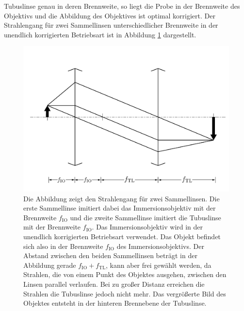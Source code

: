 \documentclass[a4paper, titlepage,  ngerman, fullpage]{book}
\begin{document}
Tubuslinse genau in deren Brennweite, so liegt die Probe in der Brennweite des Objektivs und die Abbildung des Objektives ist optimal korrigiert.\cite{Kuhl.2018} Der Strahlengang für zwei Sammellinsen unterschiedlicher Brennweite in der unendlich korrigierten Betriebsart ist in Abbildung \ref{fig:bildentstehungobjektiv} dargestellt.
	\begin{figure}
		\centering
		\includegraphics[width=0.7\linewidth]{figures/BildentstehungObjektiv.pdf}
		\caption[Strahlengang eines unendlich korrigierten Objektivs]{Die Abbildung zeigt den Strahlengang für zwei Sammellinsen. Die erste Sammellinse imitiert dabei das Immersionsobjektiv mit der Brennweite $f_\mathrm{IO}$ und die zweite Sammellinse imitiert die Tubuslinse mit der Brennweite $f_\mathrm{IO}$. Das Immersionsobjektiv wird in der unendlich korrigierten Betriebsart verwendet. Das Objekt befindet sich also in der Brennweite $f_\mathrm{IO}$ des Immersionsobjektivs. Der Abstand zwischen den beiden Sammellinsen beträgt in der Abbildung gerade $f_\mathrm{IO} + f_\mathrm{TL}$, kann aber frei gewählt werden, da Strahlen, die von einem Punkt des Objektes ausgehen, zwischen den Linsen parallel verlaufen. Bei zu großer Distanz erreichen die Strahlen die Tubuslinse jedoch nicht mehr. Das vergrößerte Bild des Objektes entsteht in der hinteren Brennebene der Tubuslinse.}
		\label{fig:bildentstehungobjektiv}
	\end{figure}
	
\end{document}
